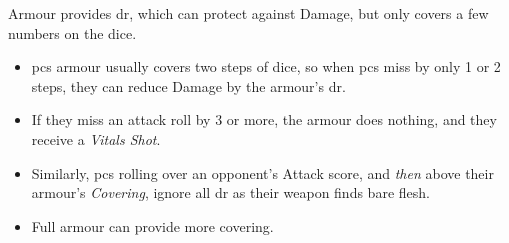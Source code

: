 Armour provides \gls{dr}, which can protect against Damage, but only covers a few numbers on the dice.

\begin{itemize}
  \item
  \Glspl{pc} armour usually covers two steps of dice, so when \glspl{pc} miss by only 1 or 2 steps, they can reduce Damage by the armour's \gls{dr}.
  \item
  If they miss an attack roll by 3 or more, the armour does nothing, and they receive a \textit{Vitals Shot}.
  \item
  Similarly, \glspl{pc} rolling over an opponent's Attack score, and \emph{then} above their armour's \textit{Covering}, ignore all \gls{dr} as their weapon finds bare flesh.
  \item
  Full armour can provide more covering.
\end{itemize}
